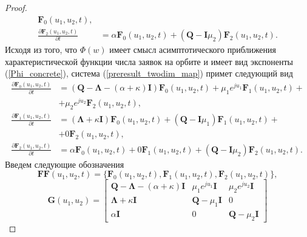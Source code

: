\begin{proof}
\begin{equation}
\begin{split}
		 \boldsymbol{F}_{0}(u_{1},u_{2},t),
		\\
		\frac{{\partial \boldsymbol{F}_{2}(u_{1},u_{2},t)}}{{\partial t}} &= \alpha \boldsymbol{F}_{0}(u_{1},u_{2},t) + (\boldsymbol{Q} - \boldsymbol{I}\mu_{2})\boldsymbol{F}_{2}(u_{1},u_{2},t).
	\end{split}
	\end{equation}  
	Исходя из того, что  $\Phi(w)$ имеет смысл асимптотического приближения характеристической функции числа заявок на орбите и имеет вид экспоненты (\ref{Phi_concrete}), система (\ref{preresult_twodim_map}) примет следующий вид
	\begin{equation} \label{result_twodim_map}
		\begin{split}
			\frac{{\partial \boldsymbol{F}_{0}(u_{1},u_{2},t)}}{{\partial t}} &= (\boldsymbol{Q}-\boldsymbol{\Lambda}-(\alpha + \kappa)\boldsymbol{I})\boldsymbol{F}_{0}(u_{1},u_{2},t) + \mu_{1} e^{ju_{1}}\boldsymbol{F}_{1}(u_{1},u_{2},t)  + \\  &+ \mu_{2}e^{ju_{2}}\boldsymbol{F}_{2}(u_{1},u_{2},t),
			\\
			\frac{{\partial \boldsymbol{F}_{1}(u_{1},u_{2},t)}}{{\partial t}} &= (\boldsymbol{\Lambda} + \kappa\boldsymbol{I}) \boldsymbol{F}_{0}(u_{1},u_{2},t) +  (\boldsymbol{Q} - \boldsymbol{I}\mu_{1})\boldsymbol{F}_{1}(u_{1},u_{2},t) + \\&+ 0\boldsymbol{F}_{2}(u_{1},u_{2},t),
			\\
			\frac{{\partial \boldsymbol{F}_{2}(u_{1},u_{2},t)}}{{\partial t}} &= \alpha \boldsymbol{F}_{0}(u_{1},u_{2},t) + 0\boldsymbol{F}_{1}(u_{1},u_{2},t) +  (\boldsymbol{Q} - \boldsymbol{I}\mu_{2})\boldsymbol{F}_{2}(u_{1},u_{2},t).
		\end{split}
	\end{equation}  
	Введем следующие обозначения
	\begin{equation*}
		\boldsymbol{FF}(u_{1},u_{2},t) = \{\boldsymbol{F}_{0}(u_{1},u_{2},t),\boldsymbol{F}_{1}(u_{1},u_{2},t),\boldsymbol{F}_{2}(u_{1},u_{2},t)\},
	\end{equation*}  
	\begin{equation*}
		\boldsymbol{G}(u_{1},u_{2})=\begin{bmatrix}
			\boldsymbol{Q}-\boldsymbol{\Lambda}-(\alpha + \kappa)\boldsymbol{I} & \mu_{1}e^{ju_{1}}\boldsymbol{I} &  \mu_{2}e^{ju_{2}}\boldsymbol{I}\\
			\boldsymbol{\Lambda}+\kappa\boldsymbol{I} & \boldsymbol{Q}-\mu_{1}\boldsymbol{I} & 0\\
			\alpha\boldsymbol{I} & 	0 &	\boldsymbol{Q}-\mu_{2}\boldsymbol{I}

\end{bmatrix}
\end{equation*}
\end{proof}
